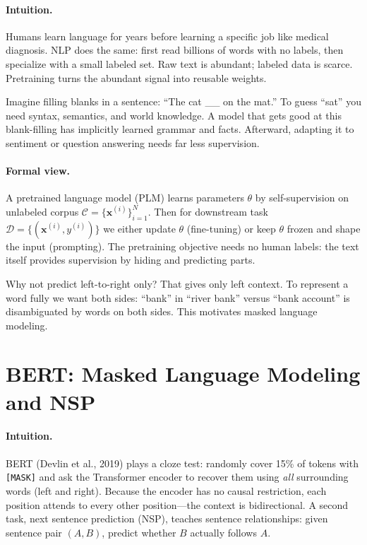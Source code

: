 \paragraph{Intuition.} Humans learn language for years before learning a specific job like medical diagnosis. NLP does the same: first read billions of words with no labels, then specialize with a small labeled set. Raw text is abundant; labeled data is scarce. Pretraining turns the abundant signal into reusable weights.

Imagine filling blanks in a sentence: ``The cat \_\_ on the mat.'' To guess ``sat'' you need syntax, semantics, and world knowledge. A model that gets good at this blank-filling has implicitly learned grammar and facts. Afterward, adapting it to sentiment or question answering needs far less supervision.

\paragraph{Formal view.} A pretrained language model (PLM) learns parameters $\theta$ by self-supervision on unlabeled corpus $\mathcal{C}=\{\mathbf{x}^{(i)}\}_{i=1}^N$. Then for downstream task $\mathcal{D}=\{(\mathbf{x}^{(i)},y^{(i)})\}$ we either update $\theta$ (fine-tuning) or keep $\theta$ frozen and shape the input (prompting). The pretraining objective needs no human labels: the text itself provides supervision by hiding and predicting parts.

Why not predict left-to-right only? That gives only left context. To represent a word fully we want both sides: ``bank'' in ``river bank'' versus ``bank account'' is disambiguated by words on both sides. This motivates masked language modeling.

\section{BERT: Masked Language Modeling and NSP}
\label{sec:bert}
\paragraph{Intuition.} BERT (Devlin et al., 2019) plays a cloze test: randomly cover 15\% of tokens with \texttt{[MASK]} and ask the Transformer encoder to recover them using \emph{all} surrounding words (left and right). Because the encoder has no causal restriction, each position attends to every other position---the context is bidirectional. A second task, next sentence prediction (NSP), teaches sentence relationships: given sentence pair $(A,B)$, predict whether $B$ actually follows $A$.

